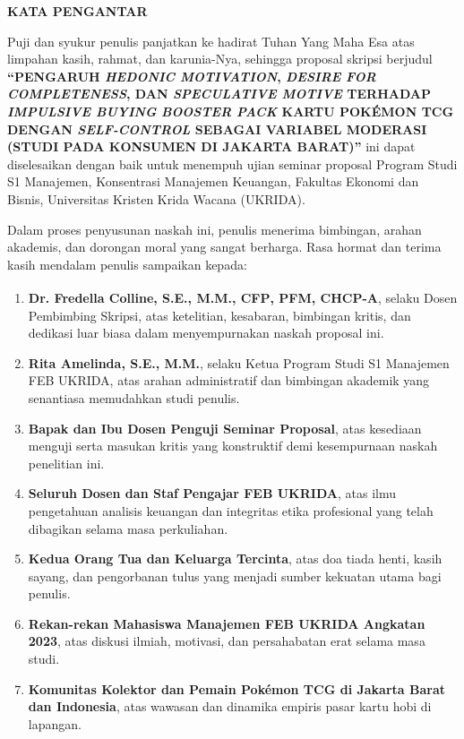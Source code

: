 \documentclass[12pt,a4paper]{article}
\numberwithin{equation}{section}
\numberwithin{table}{section}
\numberwithin{figure}{section}
\newcommand{\dosbim}{Dr. Fredella Colline, S.E., M.M., CFP\textsuperscript{\textregistered}, PFM, CHCP-A}
\newcommand{\ketprodi}{Rita Amelinda, S.E., M.M.}
\newcommand{\judulskripsi}{PENGARUH \emph{HEDONIC MOTIVATION}, \emph{DESIRE FOR COMPLETENESS}, DAN \emph{SPECULATIVE MOTIVE} TERHADAP \emph{IMPULSIVE BUYING} \emph{BOOSTER PACK} KARTU POK\'EMON TCG DENGAN \emph{SELF-CONTROL} SEBAGAI VARIABEL MODERASI (STUDI PADA KONSUMEN DI JAKARTA BARAT)}
\begin{document}
\newpage
\thispagestyle{frontmatter}
{}
\begin{singlespace}
\begin{center}
  {\large\bfseries KATA PENGANTAR}
\end{center}

\vspace{0.15cm}
Puji dan syukur penulis panjatkan ke hadirat Tuhan Yang Maha Esa atas limpahan kasih, rahmat, dan karunia-Nya, sehingga proposal skripsi berjudul \textbf{``\judulskripsi''} ini dapat diselesaikan dengan baik untuk menempuh ujian seminar proposal Program Studi S1 Manajemen, Konsentrasi Manajemen Keuangan, Fakultas Ekonomi dan Bisnis, Universitas Kristen Krida Wacana (UKRIDA).

Dalam proses penyusunan naskah ini, penulis menerima bimbingan, arahan akademis, dan dorongan moral yang sangat berharga. Rasa hormat dan terima kasih mendalam penulis sampaikan kepada:

\begin{enumerate}[topsep=1pt,itemsep=1pt,partopsep=0pt,parsep=0pt]
  \item \textbf{\dosbim}, selaku Dosen Pembimbing Skripsi, atas ketelitian, kesabaran, bimbingan kritis, dan dedikasi luar biasa dalam menyempurnakan naskah proposal ini.
  \item \textbf{\ketprodi}, selaku Ketua Program Studi S1 Manajemen FEB UKRIDA, atas arahan administratif dan bimbingan akademik yang senantiasa memudahkan studi penulis.
  \item \textbf{Bapak dan Ibu Dosen Penguji Seminar Proposal}, atas kesediaan menguji serta masukan kritis yang konstruktif demi kesempurnaan naskah penelitian ini.
  \item \textbf{Seluruh Dosen dan Staf Pengajar FEB UKRIDA}, atas ilmu pengetahuan analisis keuangan dan integritas etika profesional yang telah dibagikan selama masa perkuliahan.
  \item \textbf{Kedua Orang Tua dan Keluarga Tercinta}, atas doa tiada henti, kasih sayang, dan pengorbanan tulus yang menjadi sumber kekuatan utama bagi penulis.
  \item \textbf{Rekan-rekan Mahasiswa Manajemen FEB UKRIDA Angkatan 2023}, atas diskusi ilmiah, motivasi, dan persahabatan erat selama masa studi.
  \item \textbf{Komunitas Kolektor dan Pemain Pok\'emon TCG di Jakarta Barat dan Indonesia}, atas wawasan dan dinamika empiris pasar kartu hobi di lapangan.
\end{enumerate}


\end{singlespace}
\end{document}
